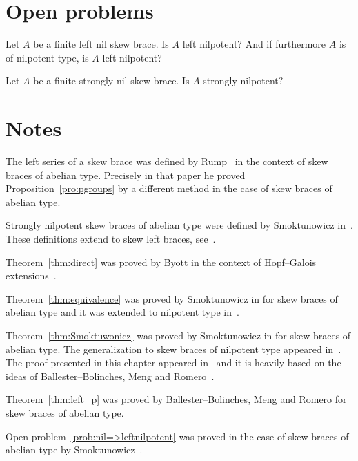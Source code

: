 

\section*{Open problems}

\begin{problem}
    \label{prob:nil=>leftnilpotent}
    Let $A$ be a finite left nil skew brace. Is $A$ left nilpotent? And if furthermore $A$ is of nilpotent type, is $A$ left nilpotent?   
\end{problem}


\begin{problem}
    \label{question:stronglynil=>stronglynilp}
    Let $A$ be a finite strongly nil skew brace.
    Is $A$ strongly nilpotent?
\end{problem}

\section*{Notes}

The left series of a skew brace was defined by Rump~\cite{MR2278047} in the context of 
skew braces of abelian type. Precisely in that paper he proved 
Proposition~\ref{pro:pgroups} by a different method 
in the case of skew braces of abelian type. 

Strongly nilpotent  skew braces of abelian type were defined by Smoktunowicz in~\cite{MR3814340}.
These definitions extend to skew left braces, see~\cite{MR3957824}.  

Theorem~\ref{thm:direct} was proved by Byott in the context of Hopf--Galois extensions~\cite{MR3030514}. 

Theorem~\ref{thm:equivalence} was proved by Smoktunowicz in \cite{MR3814340} for skew braces of abelian type and it was extended 
to nilpotent type in~\cite{MR3957824}. 

Theorem~\ref{thm:Smoktuwonicz} was proved by Smoktunowicz in \cite[Theorem 1.1]{MR3814340} for skew braces of abelian type. 
The generalization to skew braces of nilpotent type appeared in~\cite[Theorem 4.8]{MR3957824}. The proof 
presented in this chapter appeared in~\cite{MR4062375} and it is 
heavily based on the ideas of Ballester--Bolinches, Meng and Romero~\cite{MR3935814}.

Theorem~\ref{thm:left_p} was proved by Ballester--Bolinches, Meng and Romero for skew braces of abelian type.

Open problem~\ref{prob:nil=>leftnilpotent} was proved in the case of skew braces of abelian type by Smoktunowicz~\cite{MR3765444}.